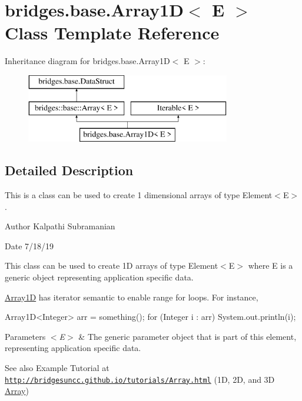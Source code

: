 \hypertarget{classbridges_1_1base_1_1_array1_d}{}\section{bridges.\+base.\+Array1D$<$ E $>$ Class Template Reference}
\label{classbridges_1_1base_1_1_array1_d}
Inheritance diagram for bridges.\+base.\+Array1D$<$ E $>$\+:\begin{figure}[H]
\begin{center}
\leavevmode
\includegraphics[height=3.000000cm]{classbridges_1_1base_1_1_array1_d}
\end{center}
\end{figure}


\subsection{Detailed Description}
This is a class can be used to create 1 dimensional arrays of type Element$<$\+E$>$. 

\begin{DoxyAuthor}{Author}
Kalpathi Subramanian
\end{DoxyAuthor}
\begin{DoxyDate}{Date}
7/18/19
\end{DoxyDate}
This class can be used to create 1D arrays of type Element$<$\+E$>$ where E is a generic object representing application specific data.

\mbox{\hyperlink{classbridges_1_1base_1_1_array1_d}{Array1D}} has iterator semantic to enable range for loops. For instance,


\begin{DoxyCode}
Array1D<Integer> arr = something();
\textcolor{keywordflow}{for} (Integer i : arr)
  System.out.println(i);
\end{DoxyCode}



\begin{DoxyParams}{Parameters}
{\em $<$\+E$>$} & The generic parameter object that is part of this element, representing application specific data.\\
\hline
\end{DoxyParams}
\begin{DoxySeeAlso}{See also}
Example Tutorial at ~\newline
 \href{http://bridgesuncc.github.io/tutorials/Array.html}{\tt http\+://bridgesuncc.\+github.\+io/tutorials/\+Array.\+html} (1D, 2D, and 3D \mbox{\hyperlink{classbridges_1_1base_1_1_array}{Array}})~\newline
 
\end{DoxySeeAlso}
